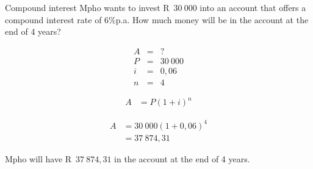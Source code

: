 

\begin{wex}{Compound interest}{
    Mpho wants to invest R~$30~000$ into an account that offers a compound interest rate of $6\%$p.a. How much money will be in the account at the end of 4 years?}{
    
    \begin{eqnarray*}
	A &=& ?\\
	P &=& 30~000\\
	i &=& 0,06\\
	n &=& 4
    \end{eqnarray*}

    \begin{align*}
	A &= P(1 + i)^n
    \end{align*}

    \begin{align*}
	A &= 30~000(1 + 0,06)^4\\
	  &= 37~874,31
    \end{align*}

    Mpho will have R~$37~874,31$ in the account at the end of 4 years.
    }
\end{wex}


